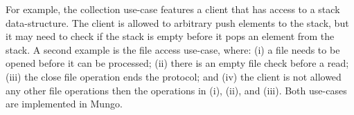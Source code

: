 For example, the collection use-case features a client
that has access to a stack data-structure. The client
is allowed to arbitrary push elements to the stack, but
it may need to check if the stack is empty before it
pops an element from the stack.
A second example is the file access use-case, where:
(i) a file needs to be opened before it can be processed;
(ii) there is an empty file check before a read;
(iii) the close file operation ends the protocol; and
(iv) the client is not allowed any other file operations then
the operations in (i), (ii), and (iii).
Both use-cases are implemented in Mungo.

%
%
%
%
%
%
%
%
%



